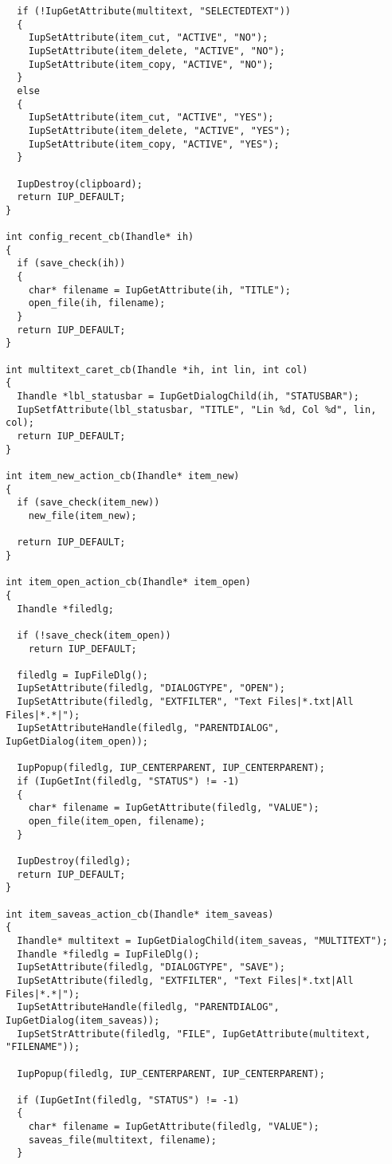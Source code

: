 \documentclass{ctexart}
\begin{document}
\begin{lstlisting}
  if (!IupGetAttribute(multitext, "SELECTEDTEXT")) 
  {
    IupSetAttribute(item_cut, "ACTIVE", "NO");
    IupSetAttribute(item_delete, "ACTIVE", "NO");
    IupSetAttribute(item_copy, "ACTIVE", "NO");
  }
  else 
  {
    IupSetAttribute(item_cut, "ACTIVE", "YES");
    IupSetAttribute(item_delete, "ACTIVE", "YES");
    IupSetAttribute(item_copy, "ACTIVE", "YES");
  }

  IupDestroy(clipboard);
  return IUP_DEFAULT;
}

int config_recent_cb(Ihandle* ih)
{
  if (save_check(ih))
  {
    char* filename = IupGetAttribute(ih, "TITLE");
    open_file(ih, filename);
  }
  return IUP_DEFAULT;
}

int multitext_caret_cb(Ihandle *ih, int lin, int col)
{
  Ihandle *lbl_statusbar = IupGetDialogChild(ih, "STATUSBAR");
  IupSetfAttribute(lbl_statusbar, "TITLE", "Lin %d, Col %d", lin, col);
  return IUP_DEFAULT;
}

int item_new_action_cb(Ihandle* item_new)
{
  if (save_check(item_new))
    new_file(item_new);

  return IUP_DEFAULT;
}

int item_open_action_cb(Ihandle* item_open)
{
  Ihandle *filedlg;

  if (!save_check(item_open))
    return IUP_DEFAULT;

  filedlg = IupFileDlg();
  IupSetAttribute(filedlg, "DIALOGTYPE", "OPEN");
  IupSetAttribute(filedlg, "EXTFILTER", "Text Files|*.txt|All Files|*.*|");
  IupSetAttributeHandle(filedlg, "PARENTDIALOG", IupGetDialog(item_open));

  IupPopup(filedlg, IUP_CENTERPARENT, IUP_CENTERPARENT);
  if (IupGetInt(filedlg, "STATUS") != -1)
  {
    char* filename = IupGetAttribute(filedlg, "VALUE");
    open_file(item_open, filename);
  }

  IupDestroy(filedlg);
  return IUP_DEFAULT;
}

int item_saveas_action_cb(Ihandle* item_saveas)
{
  Ihandle* multitext = IupGetDialogChild(item_saveas, "MULTITEXT");
  Ihandle *filedlg = IupFileDlg();
  IupSetAttribute(filedlg, "DIALOGTYPE", "SAVE");
  IupSetAttribute(filedlg, "EXTFILTER", "Text Files|*.txt|All Files|*.*|");
  IupSetAttributeHandle(filedlg, "PARENTDIALOG", IupGetDialog(item_saveas));
  IupSetStrAttribute(filedlg, "FILE", IupGetAttribute(multitext, "FILENAME"));

  IupPopup(filedlg, IUP_CENTERPARENT, IUP_CENTERPARENT);

  if (IupGetInt(filedlg, "STATUS") != -1)
  {
    char* filename = IupGetAttribute(filedlg, "VALUE");
    saveas_file(multitext, filename);
  }


\end{lstlisting}
\end{document}
